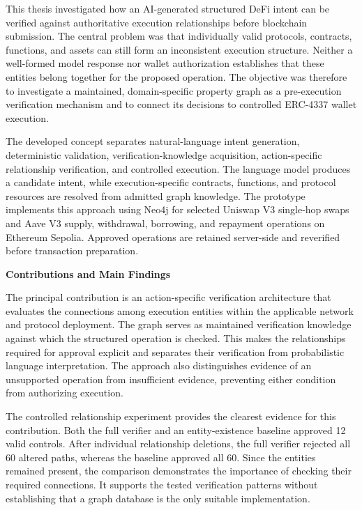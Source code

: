 
This thesis investigated how an AI-generated structured DeFi intent can
be verified against authoritative execution relationships before blockchain
submission. The central problem was that individually valid protocols,
contracts, functions, and assets can still form an inconsistent execution
structure. Neither a well-formed model response nor wallet authorization
establishes that these entities belong together for the proposed operation.
The objective was therefore to investigate a maintained, domain-specific
property graph as a pre-execution verification mechanism and to connect
its decisions to controlled ERC-4337 wallet execution.

The developed concept separates natural-language intent generation,
deterministic validation, verification-knowledge acquisition,
action-specific relationship verification, and controlled execution.
The language model produces a candidate intent, while execution-specific
contracts, functions, and protocol resources are resolved from admitted
graph knowledge. The prototype implements this approach using Neo4j for
selected Uniswap V3 single-hop swaps and Aave V3 supply, withdrawal,
borrowing, and repayment operations on Ethereum Sepolia. Approved
operations are retained server-side and reverified before transaction
preparation.

\medskip
\noindent\textbf{Contributions and Main Findings}

The principal contribution is an action-specific verification architecture
that evaluates the connections among execution entities within the
applicable network and protocol deployment. The graph serves as maintained
verification knowledge against which the structured operation is checked.
This makes the relationships required for approval explicit and separates
their verification from probabilistic language interpretation. The approach
also distinguishes evidence of an unsupported operation from insufficient
evidence, preventing either condition from authorizing execution.

The controlled relationship experiment provides the clearest evidence
for this contribution. Both the full verifier and an entity-existence
baseline approved 12 valid controls. After individual relationship
deletions, the full verifier rejected all 60 altered paths, whereas the
baseline approved all 60. Since the entities remained present, the
comparison demonstrates the importance of checking their required
connections. It supports the tested verification patterns without
establishing that a graph database is the only suitable implementation.


